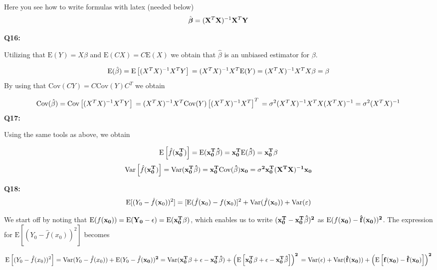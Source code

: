 \documentclass[]{article}
\begin{document}
Here you see how to write formulas with latex (needed below) \[
\hat{\boldsymbol \beta}=({\bf X}^T{\bf X})^{-1}{\bf X}^T{\bf Y}
\]

\textbf{Q16:}

Utilizing that \(\text{E}(Y) = X\beta\) and
\(\text{E}(CX) = C\text{E}(X)\) we obtain that \(\hat{\beta}\) is an
unbiased estimator for \(\beta\).

\[
\text{E}(\hat{\beta}) = \text{E}\left[(X^TX)^{-1}X^T Y\right]  \\
= (X^TX)^{-1}X^T\text{E}(Y) = (X^TX)^{-1}X^TX\beta \\
= \beta
\] By using that \(\text{Cov}(CY) = C\text{Cov}(Y)C^T\) we obtain

\[
\text{Cov}(\hat{\beta}) = \text{Cov}\left[(X^TX)^{-1}X^TY\right] \\ 
= (X^TX)^{-1}X^T\text{Cov}(Y)\left[(X^TX)^{-1}X^T\right]^T \\
= \sigma^2(X^TX)^{-1}X^TX(X^TX)^{-1} \\ 
= \sigma^2(X^TX)^{-1}
\] \textbf{Q17:}

Using the same tools as above, we obtain

\[
\text{E}\left[\hat{f}(\bf{x}_0^T)\right] = \text{E}(\bf{x}_0^T\hat{\beta}) = \bf{x}_0^T\text{E}(\hat{\beta}) = x_0^T\beta
\] \[
\text{Var}\left[\hat{f}(\bf{x}_0^T)\right] = \text{Var}(\bf{x}_0^T\hat{\beta})
= \bf{x}_0^T\text{Cov}(\hat{\beta})\bf{x}_0 \\ 
= \sigma^2\bf{x}_0^T(X^TX)^{-1}\bf{x}_0
\]

\textbf{Q18:}
\[\text{E}[(Y_0-\hat{f}({\bf x}_0))^2]=[\text{E}(\hat{f}({\bf x}_0)-f({\bf x}_0)]^2+\text{Var}(\hat{f}({\bf x}_0) ) + \text{Var}(\varepsilon)\]

We start off by noting that
\(\text{E}(f(\bf{x}_0)) = \text{E}(Y_0 - \epsilon) = \text{E}(\bf{x}_0^T\beta)\),
which enables us to write \((\bf{x}_0^T - x_0^T\hat{\beta})^2\) as
\(\text{E}(f(\bf{x}_0) - \hat{f}(\bf{x}_0))^2\). The expression for
\(\text{E}\left[(Y_0 - \hat{f}(x_0))^2\right]\) becomes

\[
\text{E}\left[(Y_0 - \hat{f}(x_0))^2\right] =
\text{Var}(Y_0 - \hat{f}(x_0)) + \text{E}(Y_0 - \hat{f}(\bf{x}_0))^2 \\
= \text{Var}(\bf{x}_0^T\beta + \epsilon - \bf{x}_0^T\hat{\beta}) \\ + \left(\text{E}\left[\bf{x}_0^T\beta + \epsilon - \bf{x}_0^T\hat{\beta}\right]\right)^2 \\
= \text{Var}(\epsilon) + \text{Var}(\hat{f}(\bf{x}_0)) + \left(\text{E}\left[f(\bf{x}_0) - \hat{f}(\bf{x}_0)\right]\right)^2
\]
\end{document}
